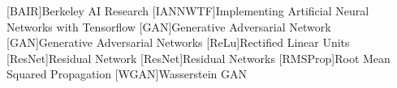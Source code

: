 \documentclass[fleqn,10pt]{SelfArx} %
\begin{document}





\begin{acronym}
[BAIR]{Berkeley AI Research}
[IANNWTF]{Implementing Artificial Neural Networks with Tensorflow}
[GAN]{Generative Adversarial Network}
[GAN]{Generative Adversarial Networks}
[ReLu]{Rectified Linear Units}
[ResNet]{Residual Network}
[ResNet]{Residual Networks}
[RMSProp]{Root Mean Squared Propagation}
[WGAN]{Wasserstein \ac{GAN}}
\end{acronym}

\end{document}
